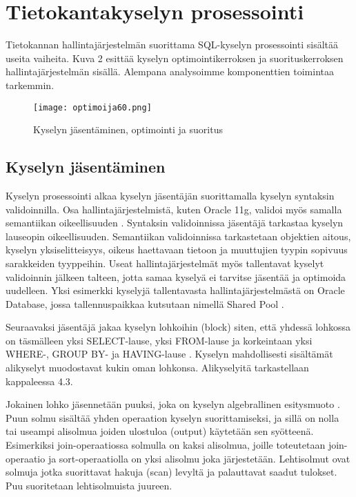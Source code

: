 \documentclass[finnish]{tktltiki2}
\theoremstyle{definition}
\theoremstyle{remark}
\begin{document}

\section{Tietokantakyselyn prosessointi}
Tietokannan hallintajärjestelmän suorittama SQL-kyselyn prosessointi sisältää useita vaiheita. Kuva 2 esittää kyselyn optimointikerroksen ja suorituskerroksen hallintajärjestelmän sisällä. Alempana analysoimme komponenttien toimintaa tarkemmin.

\begin{figure}[!h]
  \caption{Kyselyn jäsentäminen, optimointi ja suoritus \cite{ramakrishnan2003database}}
  \centering
    \texttt{[image: optimoija60.png]}
\end{figure}

\subsection{Kyselyn jäsentäminen}
Kyselyn prosessointi alkaa kyselyn jäsentäjän suorittamalla kyselyn syntaksin validoinnilla. \cite{selinger1979access} Osa hallintajärjestelmistä, kuten Oracle 11g, validoi myös samalla semantiikan oikeellisuuden \cite{oracle2009doc}. 
Syntaksin validoinnissa jäsentäjä tarkastaa kyselyn lauseopin oikeellisuuden. Semantiikan validoinnissa tarkastetaan objektien aitous, kyselyn yksiselitteisyys, oikeus haettavaan tietoon ja muuttujien tyypin sopivuus sarakkeiden tyyppeihin. Useat hallintajärjestelmät myös
tallentavat kyselyt validoinnin jälkeen talteen, jotta samaa kyselyä ei tarvitse jäsentää ja optimoida uudelleen. Yksi esimerkki kyselyjä tallentavasta hallintajärjestelmästä on Oracle Database, jossa tallennuspaikkaa kutsutaan nimellä Shared Pool \cite{oracle2005doc}. 

Seuraavaksi jäsentäjä jakaa kyselyn lohkoihin (block) siten, että yhdessä lohkossa on täsmälleen yksi SELECT-lause, yksi FROM-lause ja korkeintaan yksi WHERE-, GROUP BY- ja HAVING-lause \cite{ramakrishnan2003database}. 
Kyselyn mahdollisesti sisältämät alikyselyt muodostavat kukin oman lohkonsa. Alikyselyitä tarkastellaan kappaleessa 4.3.

Jokainen lohko jäsennetään puuksi, joka on kyselyn algebrallinen esitysmuoto \cite{mahajan2012}. 
Puun solmu sisältää yhden operaation kyselyn suorittamiseksi, ja sillä on nolla tai useampi alisolmua joiden ulostuloa (output) käytetään sen syötteenä.
Esimerkiksi join-operaatiossa solmulla on kaksi alisolmua, joille toteutetaan join-operaatio ja sort-operaatiolla on yksi alisolmu joka järjestetään.
Lehtisolmut ovat solmuja jotka suorittavat hakuja (scan) levyltä ja palauttavat saadut tulokset. 
Puu suoritetaan lehtisolmuista juureen.
\end{document}
